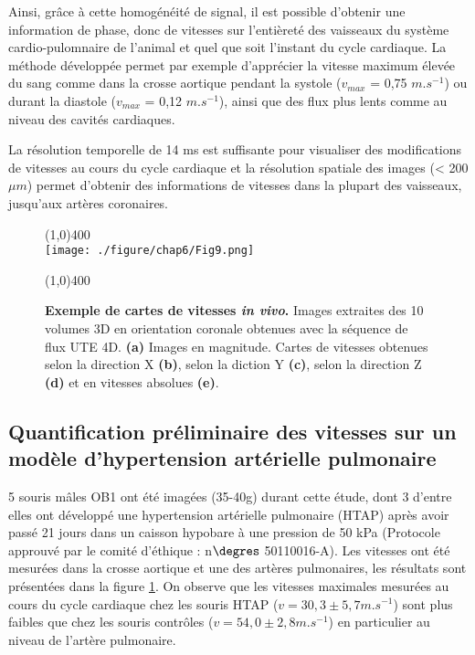 Ainsi, grâce à cette homogénéité de signal, il est possible d’obtenir une information de phase, donc de vitesses sur l’entièreté des vaisseaux du système cardio-pulomnaire de l’animal et quel que soit l’instant du cycle cardiaque. La méthode développée permet par exemple d’apprécier la vitesse maximum élevée du sang comme dans la crosse aortique  pendant la systole  ($v_{max}$ = 0,75  $m.s^{-1}$) ou durant la diastole ($v_{max}$ = 0,12  $m.s^{-1}$), ainsi que des flux plus lents comme au niveau des cavités cardiaques.

La résolution temporelle de 14 ms est suffisante pour visualiser des modifications de vitesses au cours du cycle cardiaque et la résolution spatiale des images (< 200 $\mu m$) permet d’obtenir des informations de vitesses dans la plupart des vaisseaux, jusqu’aux artères coronaires.
\newpage
\begin{figure}[H]
\centering
\line(1,0){400} \\
\texttt{[image: ./figure/chap6/Fig9.png]}
\caption[Exemple de cartes de vitesses \textit{in vivo}.]{\label{fig:CarteVitesse}\textbf{Exemple de cartes de vitesses \textit{in vivo}.} Images extraites des 10 volumes 3D en orientation coronale obtenues avec la séquence de flux UTE 4D. \textbf{(a)} Images en magnitude. Cartes de vitesses obtenues selon la direction X  \textbf{(b)}, selon la diction Y \textbf{(c)}, selon la direction Z \textbf{(d)} et en vitesses absolues \textbf{(e)}.}
\line(1,0){400} \\ 
\end{figure}

\subsection{Quantification préliminaire des vitesses sur un modèle d'hypertension artérielle pulmonaire}

5 souris mâles OB1 ont été imagées (35-40g) durant cette étude, dont 3 d'entre elles ont développé une hypertension artérielle pulmonaire (HTAP) après avoir passé 21 jours dans un caisson hypobare à une pression de 50 kPa (Protocole approuvé par le comité d'éthique : n$\degres$ 50110016-A). 
Les vitesses ont été mesurées dans la crosse aortique et une des artères pulmonaires, les résultats sont présentées dans la figure \ref{fig:CarteVitesse}. On observe que les vitesses maximales mesurées au cours du cycle cardiaque chez les souris HTAP ($v = 30,3 \pm 5,7 m.s^{-1}$) sont plus faibles que chez les souris contrôles ($v = 54,0 \pm 2,8 m.s^{-1}$) en particulier au niveau de l'artère pulmonaire.

